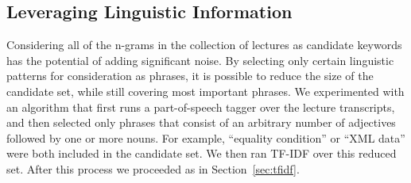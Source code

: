 \subsection{Leveraging Linguistic Information}
\label{sec:useTime}


Considering all of the n-grams in the collection of lectures as
candidate keywords has the potential of adding significant noise. By
selecting only certain linguistic patterns for consideration as
phrases, it is possible to reduce the size of the candidate set, while
still covering most important phrases. We experimented with an
algorithm that first runs a part-of-speech tagger over the lecture
transcripts, and then selected only phrases that consist of an
arbitrary number of adjectives followed by one or more nouns. For
example, ``equality condition'' or ``XML data'' were both included in
the candidate set. We then ran TF-IDF over this reduced set. After
this process we proceeded as in Section~\ref{sec:tfidf}.
